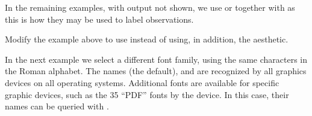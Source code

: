 \documentclass[krantz2]{krantz}\usepackage{knitr}
\begin{document}
In the remaining examples, with output not shown, we use  or  together with  as this is how they may be used to label observations.

\begin{knitrout}\footnotesize
{}\color{fgcolor}\begin{kframe}
\begin{alltt}
 \hlkwb{<-}
  \hlstd{(} \hlstd{=} \hlopt{:}\hlstd{,}
              \hlstd{=} \hlstd{(}\hlstd{,} \hlstd{),}
              \hlstd{=} \hlstd{(}\hlstd{,} \hlstd{,} \hlstd{,} \hlstd{,} \hlstd{))}

    \hlopt{+}
  \hlstd{(} \hlstd{=} \hlstd{,}  \hlstd{=} \hlstd{,}  \hlstd{=} \hlstd{)} \hlopt{+}
  \hlstd{()}
\end{alltt}
\end{kframe}
\end{knitrout}

\begin{playground}
Modify the example above to use  instead of  using, in addition, the  aesthetic.
\end{playground}

In the next example we select a different font family, using the same characters in the Roman alphabet. The names  (the default),  and  are recognized by all graphics devices on all operating systems. Additional fonts are available for specific graphic devices, such as the 35 ``PDF'' fonts by the  device. In this case, their names can be queried with .

\begin{knitrout}\footnotesize
{}\color{fgcolor}\begin{kframe}
\begin{alltt}
    \hlopt{+}
  \hlstd{(} \hlstd{=} \hlstd{,}  \hlstd{=} \hlstd{,}  \hlstd{=} \hlstd{,}  \hlstd{=} \hlstd{)} \hlopt{+}
  \hlstd{()}
\end{alltt}
\end{kframe}
\end{knitrout}
\end{document}
